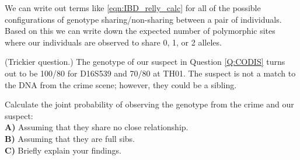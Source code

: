 We can write out terms like \eqn \eqref{eqn:IBD_relly_calc} for all of
the possible configurations of genotype
sharing/non-sharing between a pair of individuals. Based on this we can write down the expected number of
polymorphic sites where our individuals are observed to share 0, 1, or 2
alleles.

\begin{question}{ (Trickier question.)}
The genotype of our suspect in Question \ref{Q:CODIS} turns out to be 100/80 for
D16S539 and 70/80 at TH01. The suspect is not a match to the DNA
from the crime scene; however, they could be a sibling.

Calculate the joint probability of observing the genotype from the crime and our
suspect:\\
{\bf A)} Assuming that they share no close relationship.\\

{\bf B)} Assuming that they are full sibs.\\

{\bf C)} Briefly explain your findings.
  \end{question}



